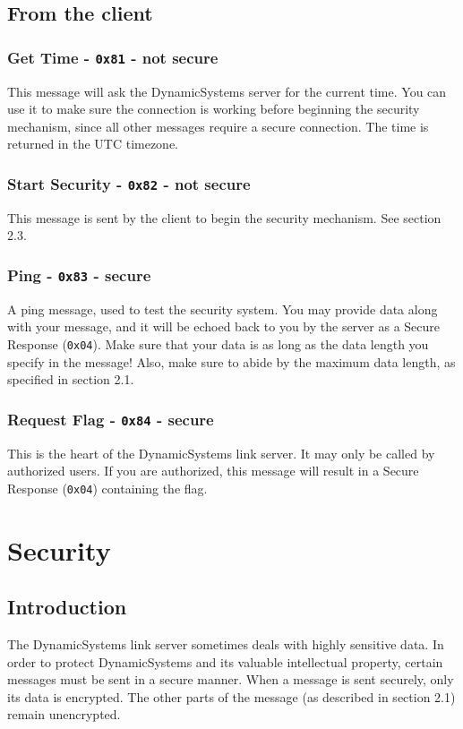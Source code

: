\documentclass{report}
\newcommand{\companyName}{DynamicSystems\texttrademark}
\newcommand{\code}[1]{\texttt{#1}}
\begin{document}
\subsection{From the client}
\subsubsection{Get Time - \code{0x81} - not secure}
This message will ask the \companyName{} server for the current time.
You can use it to make sure the connection is working before beginning the security mechanism, since all other messages require a secure connection.
The time is returned in the UTC timezone.

\subsubsection{Start Security - \code{0x82} - not secure}
This message is sent by the client to begin the security mechanism. See section 2.3.

\subsubsection{Ping - \code{0x83} - secure}
A ping message, used to test the security system.
You may provide data along with your message, and it will be echoed back to you by the server as a Secure Response (\code{0x04}).
Make sure that your data is as long as the data length you specify in the message!
Also, make sure to abide by the maximum data length, as specified in section 2.1.

\subsubsection{Request Flag - \code{0x84} - secure}
This is the heart of the \companyName{} link server.
It may only be called by authorized users.
If you are authorized, this message will result in a Secure Response (\code{0x04}) containing the flag.

\section{Security}
\subsection{Introduction}
The \companyName{} link server sometimes deals with highly sensitive data.
In order to protect \companyName{} and its valuable intellectual property, certain messages must be sent in a secure manner.
When a message is sent securely, only its data is encrypted. The other parts of the message (as described in section 2.1) remain unencrypted. \\
\end{document}
